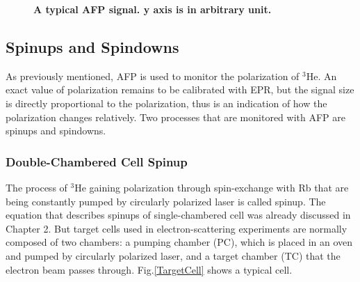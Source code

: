\begin{figure}[H]\label{AFPSignal}
	\centering
	\caption{{\bf A typical AFP signal. y axis is in arbitrary unit.}}
	\label{AFPSignal}
\end{figure}

\subsection{Spinups and Spindowns}

As previously mentioned, AFP is used to monitor the polarization of $^{3}$He. An exact value of polarization remains to be calibrated with EPR, but the signal size is directly proportional to the polarization, thus is an indication of how the polarization changes relatively. Two processes that are monitored with AFP are spinups and spindowns. 

\subsubsection{Double-Chambered Cell Spinup}

The process of $^{3}$He gaining polarization through spin-exchange with Rb that are being constantly pumped by circularly polarized laser is called spinup. The equation that describes spinups of single-chambered cell was already discussed in Chapter 2. But target cells used in electron-scattering experiments are normally composed of two chambers: a pumping chamber (PC), which is placed in an oven and pumped by circularly polarized laser, and a target chamber (TC) that the electron beam passes through. Fig.\ref{TargetCell} shows a typical cell.

